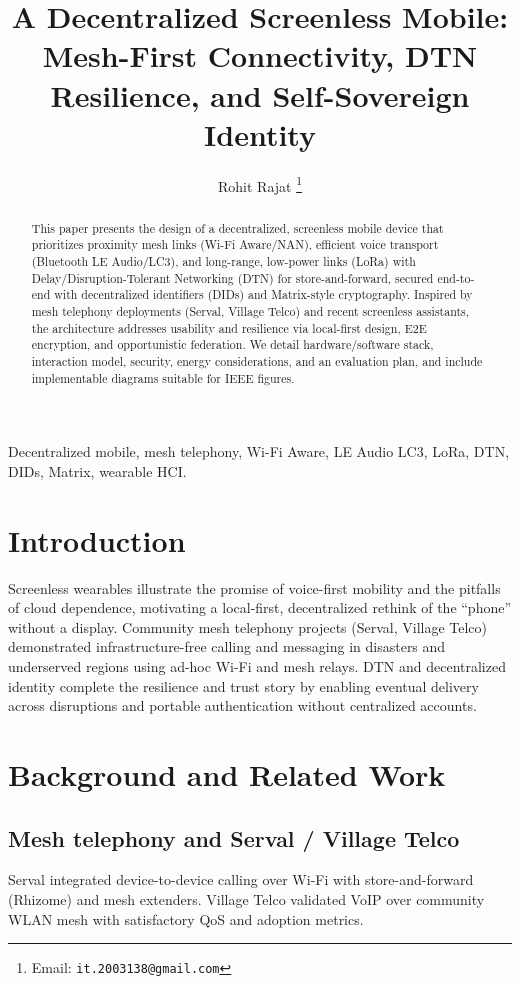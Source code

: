 \documentclass[10pt,journal,compsoc]{IEEEtran}
\title{A Decentralized Screenless Mobile: Mesh-First Connectivity, DTN Resilience, and Self-Sovereign Identity}
\author{Rohit Rajat%
\thanks{Email: \texttt{it.2003138@gmail.com}}%
}
\begin{document}
\maketitle

\begin{abstract}
This paper presents the design of a decentralized, screenless mobile device that prioritizes proximity mesh links (Wi-Fi Aware/NAN), efficient voice transport (Bluetooth LE Audio/LC3), and long-range, low-power links (LoRa) with Delay/Disruption-Tolerant Networking (DTN) for store-and-forward, secured end-to-end with decentralized identifiers (DIDs) and Matrix-style cryptography. Inspired by mesh telephony deployments (Serval, Village Telco) and recent screenless assistants, the architecture addresses usability and resilience via local-first design, E2E encryption, and opportunistic federation. We detail hardware/software stack, interaction model, security, energy considerations, and an evaluation plan, and include implementable diagrams suitable for IEEE figures.
\end{abstract}

\begin{IEEEkeywords}
Decentralized mobile, mesh telephony, Wi-Fi Aware, LE Audio LC3, LoRa, DTN, DIDs, Matrix, wearable HCI.
\end{IEEEkeywords}

\section{Introduction}
Screenless wearables illustrate the promise of voice-first mobility and the pitfalls of cloud dependence, motivating a local-first, decentralized rethink of the ``phone'' without a display. Community mesh telephony projects (Serval, Village Telco) demonstrated infrastructure-free calling and messaging in disasters and underserved regions using ad-hoc Wi-Fi and mesh relays. DTN and decentralized identity complete the resilience and trust story by enabling eventual delivery across disruptions and portable authentication without centralized accounts.

\section{Background and Related Work}
\subsection{Mesh telephony and Serval / Village Telco}
Serval integrated device-to-device calling over Wi-Fi with store-and-forward (Rhizome) and mesh extenders. Village Telco validated VoIP over community WLAN mesh with satisfactory QoS and adoption metrics.
\end{document}
